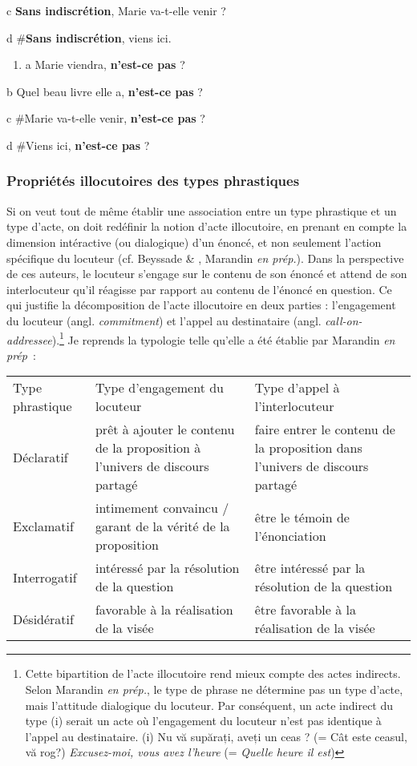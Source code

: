   c  \textbf{Sans indiscrétion}, Marie va-t-elle venir ?

  d  \#\textbf{Sans indiscrétion}, viens ici.


\begin{enumerate}
\item \label{bkm:Ref299274591}a  Marie viendra, \textbf{n'est-ce pas} ?


\end{enumerate}
  b  Quel beau livre elle a, \textbf{n'est-ce pas} ?

  c  \#Marie va-t-elle venir, \textbf{n'est-ce pas} ? 

  d  \#Viens ici, \textbf{n'est-ce pas} ?

\subsubsection{Propriétés illocutoires des types phrastiques}
Si on veut tout de même établir une association entre un type phrastique et un type d'acte, on doit redéfinir la notion d'acte illocutoire, en prenant en compte la dimension intéractive (ou dialogique) d'un énoncé, et non seulement l'action spécifique du locuteur (cf. Beyssade \& \citet{Marandin2006}, Marandin \textit{en prép.}). Dans la perspective de ces auteurs, le locuteur s'engage sur le contenu de son énoncé et attend de son interlocuteur qu'il réagisse par rapport au contenu de l'énoncé en question. Ce qui justifie la décomposition de l'acte illocutoire en deux parties : l'engagement du locuteur (angl. \textit{commitment}) et l'appel au destinataire (angl. \textit{call-on-addressee}).\footnote{Cette bipartition de l'acte illocutoire rend mieux compte des actes indirects. Selon Marandin \textit{en prép.}, le type de phrase ne détermine pas un type d'acte, mais l'attitude dialogique du locuteur. Par conséquent, un acte indirect du type (i) serait un acte où l'engagement du locuteur n'est pas identique à l'appel au destinataire.
(i)  Nu vă supărați, aveți un ceas ? (= Cât este ceasul, vă rog?) 
  \textit{Excusez-moi, vous avez l'heure} (= \textit{Quelle heure il est})
} Je reprends la typologie telle qu'elle a été établie par Marandin \textit{en prép~}:





\begin{tabular}{lll}

Type phrastique & Type d'engagement du locuteur & Type d'appel à l'interlocuteur\\
Déclaratif & prêt à ajouter le contenu de la proposition à l'univers de discours partagé & faire entrer le contenu de la proposition dans l'univers de discours partagé\\
Exclamatif & intimement convaincu / garant de la vérité de la proposition & être le témoin de l'énonciation\\
Interrogatif & intéressé par la résolution de la question & être intéressé par la résolution de la question\\
Désidératif & favorable à la réalisation de la visée & être favorable à la réalisation de la visée\\
\end{tabular}


